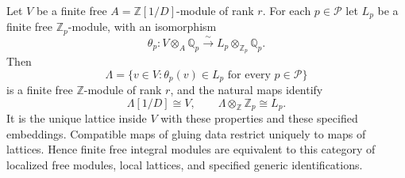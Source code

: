 \begin{theorem}\label{thm:lattice-gluing}
Let $V$ be a finite free $A=\mathbb Z[1/D]$-module of rank $r$. For each $p\in\mathcal P$ let $L_p$ be a finite free $\mathbb Z_p$-module, with an isomorphism
\[
 \theta_p:V\otimes_A\mathbb Q_p\xrightarrow{\sim}
 L_p\otimes_{\mathbb Z_p}\mathbb Q_p.
\]
Then
\[
 \Lambda=\{v\in V:\theta_p(v)\in L_p\text{ for every }p\in\mathcal P\}
\]
is a finite free $\mathbb Z$-module of rank $r$, and the natural maps identify
\[
 \Lambda[1/D]\cong V,\qquad
 \Lambda\otimes_{\mathbb Z}\mathbb Z_p\cong L_p.
\]
It is the unique lattice inside $V$ with these properties and these specified embeddings. Compatible maps of gluing data restrict uniquely to maps of lattices. Hence finite free integral modules are equivalent to this category of localized free modules, local lattices, and specified generic identifications.
\end{theorem}
